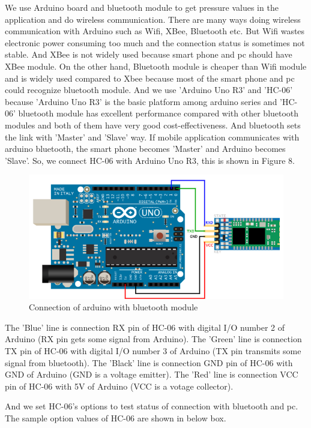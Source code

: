 \documentclass[conference]{IEEEtran}
\begin{document}
We use Arduino board and bluetooth module to get pressure values in the application and do wireless communication. There are many ways doing wireless communication with Arduino such as Wifi, XBee, Bluetooth etc. But Wifi wastes electronic power consuming too much and the connection status is sometimes not stable. And XBee is not widely used because smart phone and pc should have XBee module. On the other hand, Bluetooth module is cheaper than Wifi module and is widely used compared to Xbee because most of the smart phone and pc could recognize bluetooth module. And we use 'Arduino Uno R3' and 'HC-06' because 'Arduino Uno R3' is the basic platform among arduino series and 'HC-06' bluetooth module has excellent performance compared with other bluetooth modules and both of them have very good cost-effectiveness. And bluetooth sets the link with 'Master' and 'Slave' way. If mobile application communicates with arduino bluetooth, the smart phone becomes 'Master' and Arduino becomes 'Slave'. So, we connect HC-06 with Arduino Uno R3, this is shown in Figure 8.

\begin{figure}[h]
\begin{center}
    \includegraphics[scale=0.45]{img_02}
    \caption{Connection of arduino with bluetooth module} 
\end{center}
\end{figure}

The 'Blue' line is connection RX pin of HC-06 with digital I/O number 2 of Arduino (RX pin gets some signal from Arduino). The 'Green' line is connection TX pin of HC-06 with digital I/O number 3 of Arduino (TX pin transmits some signal from bluetooth). The 'Black' line is connection GND pin of HC-06 with GND of Arduino (GND is a voltage emitter). The 'Red' line is connection VCC pin of HC-06 with 5V of Arduino (VCC is a votage collector). 

And we set HC-06's options to test status of connection with bluetooth and pc. The sample option values of HC-06 are shown in below box.\\
\end{document}

